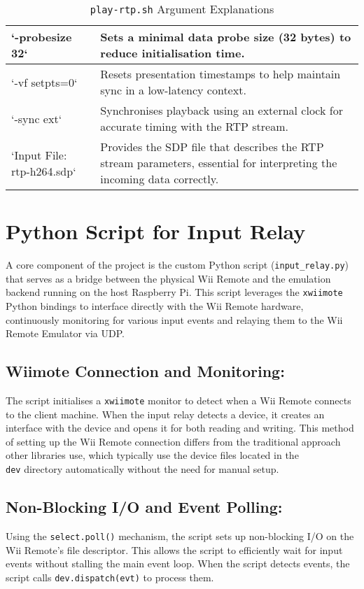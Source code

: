 \begin{table}[!ht]
{\begin{tabular}{|p{5cm}|p{10cm}|}
		`-probesize 32`                     & Sets a minimal data probe size (32 bytes) to reduce initialisation time.                                                \\ \hline
		`-vf setpts=0`                      & Resets presentation timestamps to help maintain sync in a low-latency context.                                          \\ \hline
		`-sync ext`                         & Synchronises playback using an external clock for accurate timing with the RTP stream.                                  \\ \hline
		`Input File: rtp-h264.sdp`          & Provides the SDP file that describes the RTP stream parameters, essential for interpreting the incoming data correctly. \\ \hline
	\end{tabular}}
	\caption{\texttt{play-rtp.sh} Argument Explanations}
	\label{tab:play-args}

\end{table}




\section{Python Script for Input Relay}
A core component of the project is the custom Python script
(\texttt{input\_relay.py}) that serves as a bridge between the physical
Wii Remote and the emulation backend running on the host Raspberry Pi. This
script leverages the \texttt{xwiimote} Python bindings to interface directly
with the Wii Remote hardware, continuously monitoring for various input events
and relaying them to the Wii Remote Emulator via UDP.

\subsection{Wiimote Connection and Monitoring:}
The script initialises a \texttt{xwiimote} monitor to detect when a Wii Remote connects to the client machine. When the input relay detects a device, it creates an interface with the device and opens it for both reading and writing. This method of setting up the Wii Remote connection differs from the traditional approach other libraries use, which typically use the device files located in the \texttt{\\dev} directory automatically without the need for manual setup.

\subsection{Non-Blocking I/O and Event Polling:}
Using the \texttt{select.poll()} mechanism, the script sets up non-blocking I/O on the Wii Remote’s file descriptor. This allows the script to efficiently wait for input events without stalling the main event loop. When the script detects events, the script calls \texttt{dev.dispatch(evt)} to process them.

